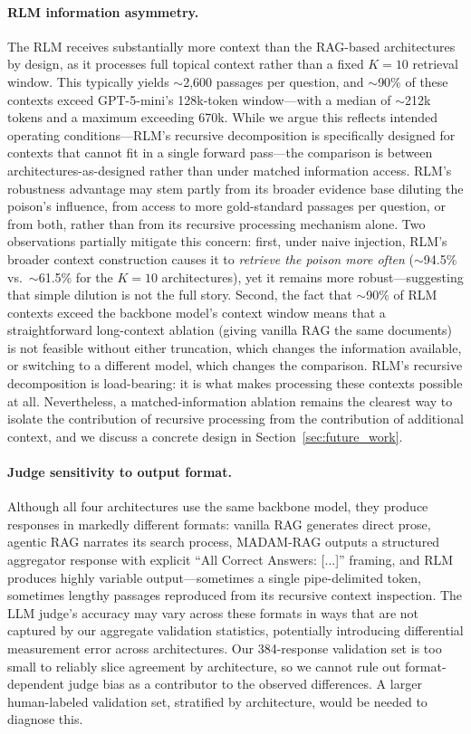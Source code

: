 \documentclass[11pt]{article}
\begin{document}
\paragraph{RLM information asymmetry.} The RLM receives substantially more context than the RAG-based architectures by design, as it processes full topical context rather than a fixed $K{=}10$ retrieval window. This typically yields ${\sim}$2,600 passages per question, and ${\sim}$90\% of these contexts exceed GPT-5-mini's 128k-token window---with a median of ${\sim}$212k tokens and a maximum exceeding 670k. While we argue this reflects intended operating conditions---RLM's recursive decomposition is specifically designed for contexts that cannot fit in a single forward pass---the comparison is between architectures-as-designed rather than under matched information access. RLM's robustness advantage may stem partly from its broader evidence base diluting the poison's influence, from access to more gold-standard passages per question, or from both, rather than from its recursive processing mechanism alone. Two observations partially mitigate this concern: first, under naive injection, RLM's broader context construction causes it to \emph{retrieve the poison more often} (${\sim}$94.5\% vs.\ ${\sim}$61.5\% for the $K{=}10$ architectures), yet it remains more robust---suggesting that simple dilution is not the full story. Second, the fact that ${\sim}$90\% of RLM contexts exceed the backbone model's context window means that a straightforward long-context ablation (giving vanilla RAG the same documents) is not feasible without either truncation, which changes the information available, or switching to a different model, which changes the comparison. RLM's recursive decomposition is load-bearing: it is what makes processing these contexts possible at all. Nevertheless, a matched-information ablation remains the clearest way to isolate the contribution of recursive processing from the contribution of additional context, and we discuss a concrete design in Section~\ref{sec:future_work}.

\paragraph{Judge sensitivity to output format.} Although all four architectures use the same backbone model, they produce responses in markedly different formats: vanilla RAG generates direct prose, agentic RAG narrates its search process, MADAM-RAG outputs a structured aggregator response with explicit ``All Correct Answers: [...]'' framing, and RLM produces highly variable output---sometimes a single pipe-delimited token, sometimes lengthy passages reproduced from its recursive context inspection. The LLM judge's accuracy may vary across these formats in ways that are not captured by our aggregate validation statistics, potentially introducing differential measurement error across architectures. Our 384-response validation set is too small to reliably slice agreement by architecture, so we cannot rule out format-dependent judge bias as a contributor to the observed differences. A larger human-labeled validation set, stratified by architecture, would be needed to diagnose this.
\end{document}
